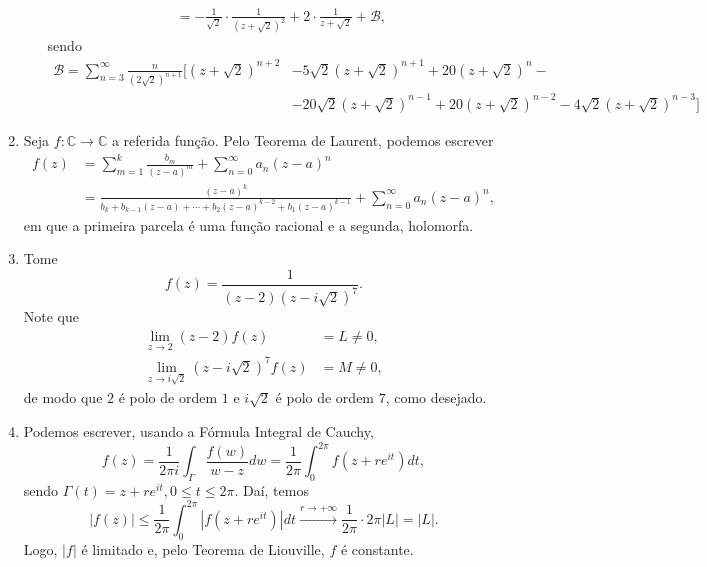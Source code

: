 \documentclass[12pt,a4paper]{article}
\begin{document}
\begin{enumerate}
\begin{enumerate}[(i)]
\begin{align*}
			&= -\frac{1}{\sqrt{2}}\cdot\frac{1}{(z+\sqrt{2})^2} + 2\cdot\frac{1}{z+\sqrt{2}} + \mathcal{B},
			\end{align*}
			sendo 
			\begin{align*}
			\mathcal{B} = \sum_{n=3}^{\infty}\frac{n}{(2\sqrt{2})^{n+1}} [(z+\sqrt{2})^{n+2} &- 5\sqrt{2}(z+\sqrt{2})^{n+1} + 20(z+\sqrt{2})^n - \\ 
			&- 20\sqrt{2}(z+\sqrt{2})^{n-1} + 20(z+\sqrt{2})^{n-2} - 4\sqrt{2}(z+\sqrt{2})^{n-3} ]
			\end{align*}
			
		\end{enumerate}
		
		\item Seja $f:\mathbb{C}\to\mathbb{C}$ a referida função. Pelo Teorema de Laurent, podemos escrever
		\begin{align*} 
		f(z) &= \sum_{m=1}^{k}\frac{b_m}{(z-a)^m} + \sum_{n=0}^{\infty}a_n(z-a)^n \\ &= \frac{(z-a)^k}{b_k + b_{k-1}(z-a) + \cdots + b_2(z-a)^{k-2} + b_1(z-a)^{k-1}} +  \sum_{n=0}^{\infty}a_n(z-a)^n,
		\end{align*} 
		em que a primeira parcela é uma função racional e a segunda, holomorfa.
		
		
		\item Tome 
		$$
		f(z) = \frac{1}{(z-2)(z-i\sqrt{2})^7}.
		$$
		Note que
		\begin{align*}
		\lim\limits_{z\to 2}(z-2)f(z) &= L\neq 0, \\
		\lim\limits_{z\to i\sqrt{2}}(z-i\sqrt{2})^7f(z) &= M\neq 0,
		\end{align*}
		de modo que $2$ é polo de ordem $1$ e $i\sqrt{2}$ é polo de ordem $7$, como desejado.
		
		\item 
		
		Podemos escrever, usando a Fórmula Integral de Cauchy,
		$$
		f(z) = \frac{1}{2\pi i}\int_{\Gamma} \frac{f(w)}{w-z}dw = \frac{1}{2\pi}\int_{0}^{2\pi}f(z+re^{it})dt,
		$$
		sendo $\Gamma(t) = z+re^{it}, 0\leq t\leq 2\pi$. Daí, temos
		$$
		|f(z)| \leq \frac{1}{2\pi}\int_{0}^{2\pi}|f(z+re^{it})|dt \xrightarrow{r\to +\infty} \frac{1}{2\pi}\cdot 2\pi|L| = |L|.
		$$
		Logo, $|f|$ é limitado e, pelo Teorema de Liouville, $f$ é constante.
		

\end{enumerate}
\end{document}
